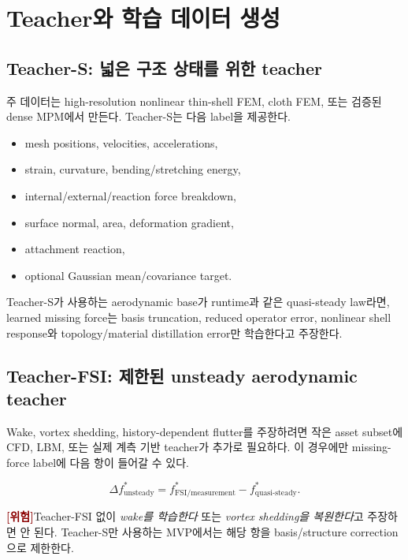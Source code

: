 \documentclass[11pt,a4paper]{article}
\newcommand{\risk}{\textcolor{darkred}{\textbf{[위험]}}}
\begin{document}
\section{Teacher와 학습 데이터 생성}

\subsection{Teacher-S: 넓은 구조 상태를 위한 teacher}

주 데이터는 high-resolution nonlinear thin-shell FEM, cloth FEM,
또는 검증된 dense MPM에서 만든다.
Teacher-S는 다음 label을 제공한다.

\begin{itemize}[leftmargin=1.5em]
  \item mesh positions, velocities, accelerations,
  \item strain, curvature, bending/stretching energy,
  \item internal/external/reaction force breakdown,
  \item surface normal, area, deformation gradient,
  \item attachment reaction,
  \item optional Gaussian mean/covariance target.
\end{itemize}

Teacher-S가 사용하는 aerodynamic base가 runtime과 같은 quasi-steady law라면,
learned missing force는 basis truncation, reduced operator error,
nonlinear shell response와 topology/material distillation error만 학습한다고 주장한다.

\subsection{Teacher-FSI: 제한된 unsteady aerodynamic teacher}

Wake, vortex shedding, history-dependent flutter를 주장하려면
작은 asset subset에 CFD, LBM, 또는 실제 계측 기반 teacher가 추가로 필요하다.
이 경우에만 missing-force label에 다음 항이 들어갈 수 있다.

\begin{equation}
  \Delta f_{\mathrm{unsteady}}^*
  =
  f_{\mathrm{FSI/measurement}}^*
  -
  f_{\mathrm{quasi\mbox{-}steady}}^*.
\end{equation}

\risk Teacher-FSI 없이 \emph{wake를 학습한다} 또는
\emph{vortex shedding을 복원한다}고 주장하면 안 된다.
Teacher-S만 사용하는 MVP에서는 해당 항을 basis/structure correction으로 제한한다.
\end{document}

